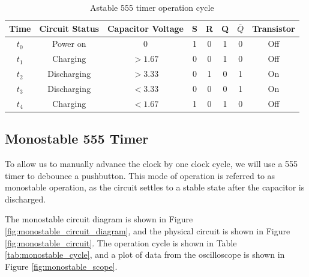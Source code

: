 \documentclass[12pt]{article}
\begin{document}
\begin{FlushLeft}
\begin{table}[h]
  \begin{center}
    \begin{tabular}{ c | c c c c c c c }
      Time & Circuit Status & Capacitor Voltage & S & R & Q & $\overline Q$ & Transistor \\
      \hline
      $t_0$ & Power on    & 0       & 1 & 0 & 1 & 0 & Off \\
      $t_1$ & Charging    & $>1.67$ & 0 & 0 & 1 & 0 & Off \\
      $t_2$ & Discharging & $>3.33$ & 0 & 1 & 0 & 1 & On  \\
      $t_3$ & Discharging & $<3.33$ & 0 & 0 & 0 & 1 & On  \\
      $t_4$ & Charging    & $<1.67$ & 1 & 0 & 1 & 0 & Off \\
    \end{tabular}
    \caption{Astable 555 timer operation cycle}
    \label{tab:astable_cycle}
  \end{center}
\end{table}

\clearpage


\subsection{Monostable 555 Timer}
To allow us to manually advance the clock by one clock cycle, we will use a 555 timer to debounce a pushbutton. This mode of operation is referred to as monostable operation, as the circuit settles to a stable state after the capacitor is discharged.

\vspace{0.3cm}

The monostable circuit diagram is shown in Figure \ref{fig:monostable_circuit_diagram}, and the physical circuit is shown in Figure \ref{fig:monostable_circuit}. The operation cycle is shown in Table \ref{tab:monostable_cycle}, and a plot of data from the oscilloscope is shown in Figure \ref{fig:monostable_scope}.


\end{FlushLeft}
\end{document}
